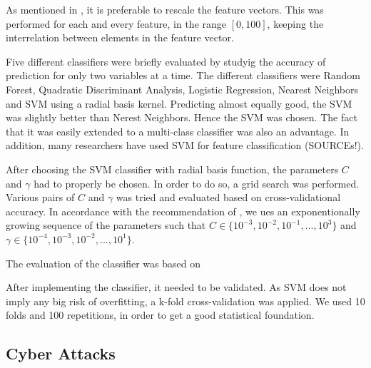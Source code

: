 As mentioned in , it is preferable to rescale the feature vectors. This was performed for each and every feature, in the range $[0,100]$, keeping the interrelation between elements in the feature vector. 

Five different classifiers were briefly evaluated by studyig the accuracy of prediction for only two variables at a time. The different classifiers were Random Forest, Quadratic Discriminant Analysis, Logistic Regression, Nearest Neighbors and SVM using a radial basis kernel. Predicting almost equally good, the SVM was slightly better than Nerest Neighbors. Hence the SVM was chosen. The fact that it was easily extended to a multi-class classifier was also an advantage. In addition, many researchers have used SVM for feature classification (SOURCEs!). 

After choosing the SVM classifier with radial basis function, the parameters $C$ and $\gamma$ had to properly be chosen. In order to do so, a grid search was performed. Various pairs of $C$ and $\gamma$ was tried and evaluated based on cross-validational accuracy. In accordance with the recommendation of \citet{Hsu10apractical}, we ues an exponentionally growing sequence of  the parameters such that $C\in\{10^{-3},10^{-2},10^{-1},...,10^{3}\}$ and $\gamma\in\{10^{-4},10^{-3},10^{-2},...,10^{1}\}$.

The evaluation of the classifier was based on 

After implementing the classifier, it needed to be validated. As SVM does not imply any big risk of overfitting, a k-fold cross-validation was applied. We used 10 folds and 100 repetitions, in order to get a good statistical foundation. 


\subsection{Cyber Attacks}



\newpage 
